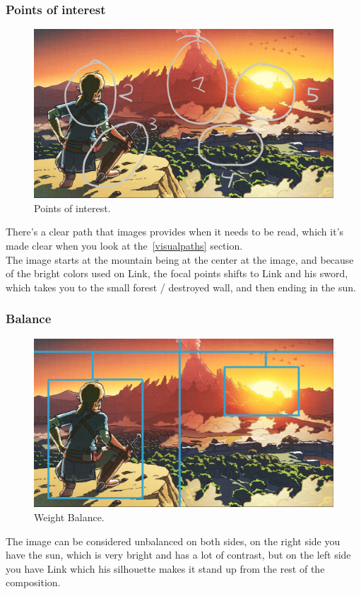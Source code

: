 \documentclass{cup-pan}
\begin{document}
            \subsubsection{Points of interest}
                \begin{figure}[H]
                    \includegraphics[width = \textwidth]{Imagenes/Referencias/Analisis_ConceptArt/puntos interes.png}
                    \caption{Points of interest.}
                \end{figure}
                There's a clear path that images provides when it needs to be read, which it's made clear when you look at the~\ref{visualpaths} section.\\

                The image starts at the mountain being at the center at the image, and because of the bright colors used on Link, the focal points shifts to Link and his sword, which takes you to the small forest / destroyed wall, and then ending in the sun.\\

            \subsubsection{Balance}
                \begin{figure}[H]
                    \includegraphics[width=\textwidth]{Imagenes/Referencias/Analisis_ConceptArt/balanza.png}
                    \caption{Weight Balance.}
                \end{figure}
                The image can be considered unbalanced on both sides, on the right side you have the sun, which is very bright and has a lot of contrast, but on the left side you have Link which his silhouette makes it stand up from the rest of the composition. 
        \newpage
\end{document}
